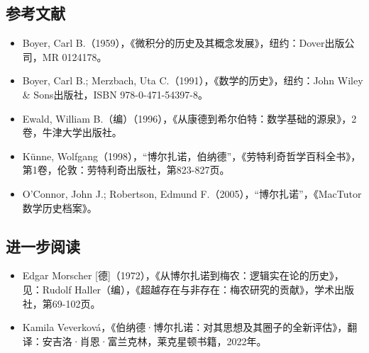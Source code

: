 \subsection{参考文献 }  
\begin{itemize}
\item Boyer, Carl B.（1959），《微积分的历史及其概念发展》，纽约：Dover出版公司，MR 0124178。  
\item Boyer, Carl B.; Merzbach, Uta C.（1991），《数学的历史》，纽约：John Wiley & Sons出版社，ISBN 978-0-471-54397-8。  
\item Ewald, William B.（编）（1996），《从康德到希尔伯特：数学基础的源泉》，2卷，牛津大学出版社。  
\item Künne, Wolfgang（1998），“博尔扎诺，伯纳德”，《劳特利奇哲学百科全书》，第1卷，伦敦：劳特利奇出版社，第823-827页。  
\item O'Connor, John J.; Robertson, Edmund F.（2005），“博尔扎诺”，《MacTutor数学历史档案》。
\end{itemize}
\subsection{进一步阅读} 
\begin{itemize}
\item Edgar Morscher [德]（1972），《从博尔扎诺到梅农：逻辑实在论的历史》，见：Rudolf Haller（编），《超越存在与非存在：梅农研究的贡献》，学术出版社，第69-102页。  
\item Kamila Veverková，《伯纳德·博尔扎诺：对其思想及其圈子的全新评估》，翻译：安吉洛·肖恩·富兰克林，莱克星顿书籍，2022年。
\end{itemize} 
